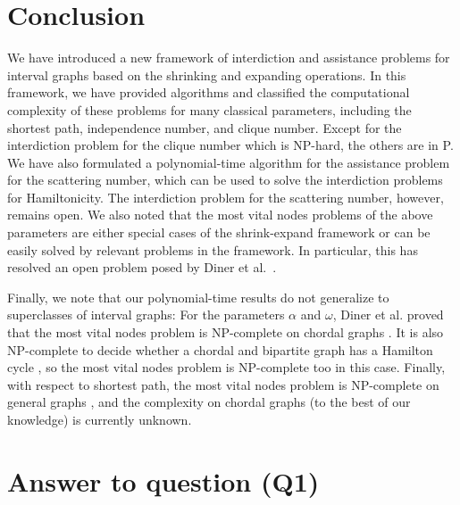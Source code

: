 

\section{Conclusion}
We have introduced a new framework of interdiction and assistance problems for interval graphs based on the shrinking and expanding operations.
In this framework, we have provided algorithms and classified the computational complexity of these problems for many classical parameters, including the shortest path, independence number, and clique number.
Except for the interdiction problem for the clique number which is NP-hard, the others are in P.
We have also formulated a polynomial-time algorithm for the assistance problem for the scattering number, which can be used to solve the interdiction problems for Hamiltonicity.
The interdiction problem for the scattering number, however, remains open.
We also noted that the most vital nodes problems of the above parameters are either special cases of the shrink-expand framework or can be easily solved by relevant problems in the framework. 
In particular, this has resolved an open problem posed by Diner et al.~\cite[(Q2)]{diner2018contractionDeletionBlockers}.

Finally, we note that our polynomial-time results do not generalize to superclasses of interval graphs: For the parameters $\alpha$ and $\omega$, Diner et al. proved that the most vital nodes problem is NP-complete on chordal graphs \cite{diner2018contractionDeletionBlockers}. It is also NP-complete to decide whether a chordal and bipartite graph has a Hamilton cycle \cite{muller1996hamiltonian}, so the most vital nodes problem is NP-complete too in this case. Finally, with respect to shortest path, the most vital nodes problem is NP-complete on general graphs \cite{complexityOfFindingMostVitalNodesShortestPath}, and the complexity on chordal graphs (to the best of our knowledge) is currently unknown. 

\section{Answer to question (Q1)}
\label{app:contraction}

